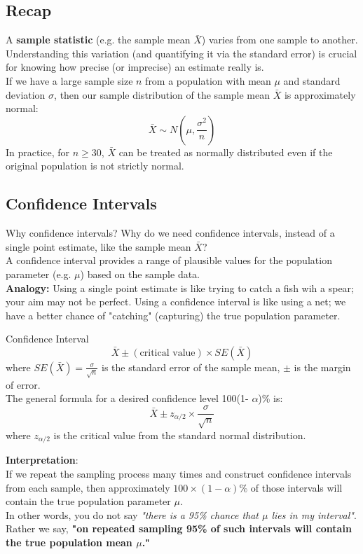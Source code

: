 \documentclass[9pt]{extarticle}
\begin{document}
\subsection{Recap}
A \textbf{sample statistic} (e.g. the sample mean $\bar{X}$) varies from one sample to another. Understanding this variation (and quantifying it via the standard error) is crucial for knowing how precise (or imprecise) an estimate really is. \\[2ex]
If we have a large sample size $n$ from a population with mean $\mu$ and standard deviation $\sigma$, then our sample distribution of the sample mean $\bar{X}$ is approximately normal:
$$\bar{X} \sim N\left(\mu, \frac{\sigma^2}{n}\right)$$
In practice, for $n \geq 30$, $\bar{X}$ can be treated as normally distributed even if the original population is not strictly normal.
\subsection{Confidence Intervals}
\begin{conceptbox}{Why confidence intervals?}{}
    Why do we need confidence intervals, instead of a single point estimate, like the sample mean $\bar{X}$? \\

    A confidence interval provides a range of plausible values for the population parameter (e.g. $\mu$) based on the sample data. \\

    \textbf{Analogy:}  Using a single point estimate is like trying to catch a fish wih a spear; your aim may not be perfect. Using a confidence interval is like using a net; we have a better chance of "catching" (capturing) the true population parameter.
\end{conceptbox}
\begin{definitionbox}{Confidence Interval}{}
    $$\bar{X} \pm (\text{critical value}) \times SE(\bar{X})$$
    where $SE(\bar{X}) = \frac{\sigma}{\sqrt{n}}$ is the standard error of the sample mean, $\pm$ is the margin of error. \\
    The general formula for a desired confidence level 100(1- $\alpha$)\% is:
    $$\bar{X} \pm z_{\alpha/2} \times \frac{\sigma}{\sqrt{n}}$$
    where $z_{\alpha/2}$ is the critical value from the standard normal distribution.
\end{definitionbox}
\noindent\textbf{Interpretation}: \\
If we repeat the sampling process many times and construct confidence intervals from each sample, then approximately $100 \times (1 - \alpha)\%$ of those intervals will contain the true population parameter $\mu$.\\
In other words, you do not say \emph{"there is a 95\% chance that $\mu$ lies in my interval"}. Rather we say, \textbf{"on repeated sampling 95\% of such intervals will contain the true population mean $\mu$."}
\end{document}
